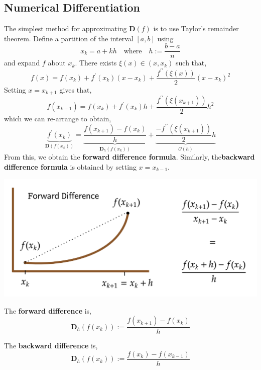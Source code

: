 \subsection{Numerical Differentiation}
The simplest method for approximating $\mathbf{D}(f)$ is to use Taylor's remainder theorem. Define a partition of the interval $[a,b]$ using
\[x_k = a + kh \quad \text{where} \quad h := \frac{b-a}{n}\]
and expand $f$ about $x_k$. There exists $\xi(x) \in (x, x_k)$ such that,
\[f(x) = f(x_k) + f^{\prime}(x_k)(x-x_k) + \frac{f^{\prime\prime}(\xi(x))}{2}(x-x_k)^2\]
Setting $x = x_{k+1}$ gives that,
\[f\left(x_{k+1}\right)=f\left(x_k\right)+f^{\prime}\left(x_k\right) h+\frac{f^{\prime \prime}\left(\xi\left(x_{k+1}\right)\right)}{2} h^2\]
which we can re-arrange to obtain,
\[\underbrace{f^{\prime}\left(x_k\right)}_{\mathbf{D} (f\left(x_k\right))}=\underbrace{\frac{f\left(x_{k+1}\right)-f\left(x_k\right)}{h}}_{\mathbf{D}_h (f\left(x_k\right))}+\underbrace{\frac{-f^{\prime \prime}\left(\xi\left(x_{k+1}\right)\right)}{2} h}_{\mathcal{O}(h)}\]
From this, we obtain the \textbf{forward difference formula}. Similarly, the\textbf{backward difference formula} is obtained by setting $x = x_{k - 1}$.

\begin{marginfigure}
\begin{center}
       \includegraphics[width=\textwidth]{figures/fig-22.png}
\end{center}
\end{marginfigure}

\begin{defn}
    The \textbf{forward difference} is,
    \[\mathbf{D}_h (f(x_k)) := \frac{f(x_{k+1}) - f(x_k)}{h}\]
\end{defn}

\begin{defn}
    The \textbf{backward difference} is,
    \[\mathbf{D}_h (f(x_k)) := \frac{f(x_{k}) - f(x_{k-1})}{h}\]
\end{defn}

